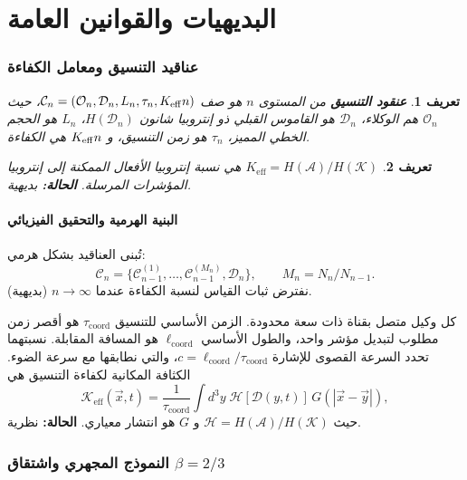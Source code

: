 \documentclass[11pt,a4paper]{article}
\newtheorem{definition}{تعريف}[section]
\newcommand{\Keff}[1][]{K_{\mathrm{eff}\if\relax\detokenize{#1}\relax\else,#1\fi}}
\newcommand{\coord}{\mathrm{coord}}
\newcommand{\Dir}{\mathcal{D}}
\newcommand{\cC}{\mathcal{C}}
\begin{document}
	\tableofcontents
	\newpage
	
	\part{البديهيات والقوانين العامة}
	
	\section{عناقيد التنسيق ومعامل الكفاءة}
	\begin{definition}
		\textbf{عنقود التنسيق} من المستوى \(n\) هو صف \(\cC_n = (\mathcal{O}_n, \Dir_n, L_n, \tau_n, \Keff{n})\)، حيث \(\mathcal{O}_n\) هم الوكلاء، \(\Dir_n\) هو القاموس القبلي ذو إنتروبيا شانون \(H(\Dir_n)\)، \(L_n\) هو الحجم الخطي المميز، \(\tau_n\) هو زمن التنسيق، و \(\Keff{n}\) هي الكفاءة.
	\end{definition}
	
	\begin{definition}
		\(K_{\mathrm{eff}} = H(\mathcal{A})/H(\mathcal{K})\) هي نسبة إنتروبيا الأفعال الممكنة إلى إنتروبيا المؤشرات المرسلة. \textbf{الحالة:} بديهية.
	\end{definition}
	
	\subsection{البنية الهرمية والتحقيق الفيزيائي}
	تُبنى العناقيد بشكل هرمي:
	\[
	\cC_n = \{\cC_{n-1}^{(1)},\dots,\cC_{n-1}^{(M_n)},\Dir_n\}, \qquad M_n = N_n/N_{n-1}.
	\]
	نفترض ثبات القياس لنسبة الكفاءة عندما \(n\to\infty\) (بديهية).
	
	كل وكيل متصل بقناة ذات سعة محدودة. الزمن الأساسي للتنسيق \(\tau_{\coord}\) هو أقصر زمن مطلوب لتبديل مؤشر واحد، والطول الأساسي \(\ell_{\coord}\) هو المسافة المقابلة. نسبتهما تحدد السرعة القصوى للإشارة \(c = \ell_{\coord}/\tau_{\coord}\)، والتي نطابقها مع سرعة الضوء. الكثافة المكانية لكفاءة التنسيق هي
	\begin{equation}
		\mathcal{K}_{\mathrm{eff}}(\vec{x},t) = \frac{1}{\tau_{\coord}} \int d^3y\; \mathcal{H}[\Dir(y,t)]\, G(|\vec{x}-\vec{y}|),
		\label{eq:Kfield}
	\end{equation}
	حيث \(\mathcal{H} = H(\mathcal{A})/H(\mathcal{K})\) و \(G\) هو انتشار معياري. \textbf{الحالة:} نظرية.
	
	\section{النموذج المجهري واشتقاق \(\beta = 2/3\)}
	\label{sec:micro}
	
\end{document}

